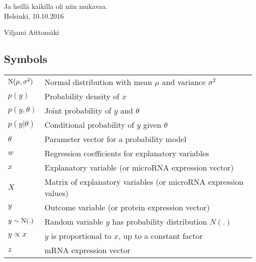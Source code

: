 \documentclass[english,12pt,a4paper,pdftex,elec,utf8]{aaltothesis}
\begin{document}

\newpage

Ja heillä kaikilla oli niin mukavaa.\\

\vspace{5cm}
Helsinki, 10.10.2016

\vspace{5mm}
{\hfill Viljami Aittom\"aki \hspace{1cm}}


\newpage


\thesistableofcontents














\subsection*{Symbols}

\begin{tabular}{ll}
$\textup{N}(\mu,\sigma^2)$ & Normal distribution with mean $\mu$ and variance $\sigma^2$ \\
$p(y)$                     & Probability density of $x$ \\
$p(y,\theta)$              & Joint probability of $y$ and $\theta$ \\
$p(y|\theta)$              & Conditional probability of $y$ given $\theta$ \\
$\theta$                   & Parameter vector for a probability model \\
$w$                        & Regression coefficients for explanatory variables \\
$x$                        & Explanatory variable (or microRNA expression vector) \\
$X$                        & Matrix of explanatory variables (or microRNA expression values) \\
$y$                        & Outcome variable (or protein expression vector) \\
$y \sim \textup{N}(.)$     & Random variable $y$ has probability distribution $N(.)$ \\
$y \propto x$              & $y$ is proportional to $x$, up to a constant factor \\
$z$                        & mRNA expression vector
\end{tabular}
\end{document}
